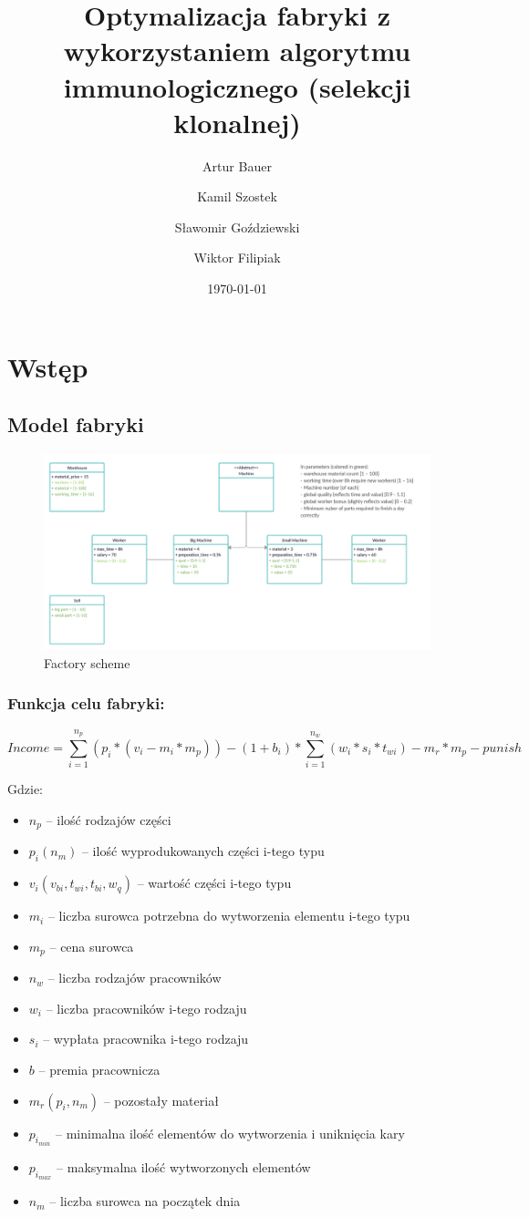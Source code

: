 \documentclass[a4paper]{article}
\title{Optymalizacja fabryki z wykorzystaniem algorytmu immunologicznego (selekcji klonalnej)}
\author{Artur Bauer \and Kamil Szostek \and Sławomir Goździewski \and Wiktor Filipiak}
\date{\today}
\begin{document}


\tableofcontents

\newpage
\section{Wstęp}
\subsection{Model fabryki}\label{factory}

\begin{figure}[ht]
\centering
\includegraphics[width=.7\textwidth]{Factory_scheme.png}
\caption{Factory scheme}
\end{figure}

\subsubsection{Funkcja celu fabryki:}\label{factory-main-goal-function}

$$Income = \sum^{n_p}_{i=1}(p_i*(v_i-m_i*m_p)) - (1+b_i)*\sum^{n_w}_{i = 1}(w_i*s_i *t_{wi}) - m_r*m_p - punish$$

Gdzie:
\begin{itemize}
    \item $n_p$ -- ilość rodzajów części
    \item $p_i (n_m)$ -- ilość wyprodukowanych części i-tego typu
    \item $v_i(v_{bi}, t_{wi},t_{bi},w_q)$ -- wartość części i-tego typu
    \item $m_i$ -- liczba surowca potrzebna do wytworzenia elementu i-tego typu
    \item $m_p$ -- cena surowca
    \item $n_w$ -- liczba rodzajów pracowników
    \item $w_i$ -- liczba pracowników i-tego rodzaju
    \item $s_i$ -- wypłata pracownika i-tego rodzaju
    \item $b$ -- premia pracownicza
    \item $m_r(p_i,n_m)$ -- pozostały materiał
    \item $p_{i_{min}}$ -- minimalna ilość elementów do wytworzenia i uniknięcia kary
    \item $p_{i_{max}}$ -- maksymalna ilość wytworzonych elementów
    \item $n_m$ -- liczba surowca na początek dnia
\end{itemize}
\end{document}
